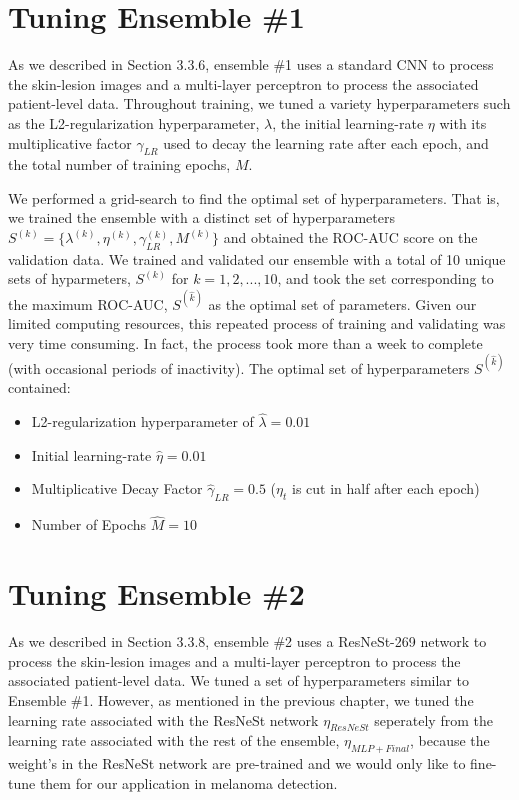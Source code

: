 \documentclass [MAS] {uclathes}
\begin{document}
\section{Tuning Ensemble \#1}

As we described in Section 3.3.6, ensemble \#1 uses a standard CNN to process the skin-lesion images and a multi-layer perceptron to process the associated patient-level data. Throughout training, we tuned a variety hyperparameters such as the L2-regularization hyperparameter, $\lambda$, the initial learning-rate $\eta$ with its multiplicative factor $\gamma_{LR}$ used to decay the learning rate after each epoch, and the total number of training epochs, $M$.

We performed a grid-search to find the optimal set of hyperparameters. That is, we trained the ensemble with a distinct set of hyperparameters $S^{(k)} = \{\lambda^{(k)}, \eta^{(k)}, \gamma_{LR}^{(k)}, M^{(k)}\}$ and obtained the ROC-AUC score on the validation data. We trained and validated our ensemble with a total of 10 unique sets of hyparmeters, $S^{(k)}$ for $k=1, 2, ..., 10$, and took the set corresponding to the maximum ROC-AUC, $S^{(\hat k)}$ as the optimal set of parameters. Given our limited computing resources, this repeated process of training and validating was very time consuming. In fact, the process took more than a week to complete (with occasional periods of inactivity). The optimal set of hyperparameters $S^{(\hat k)}$ contained:

\begin{itemize}
    \item L2-regularization hyperparameter of $\hat \lambda = 0.01$
    \item Initial learning-rate $\hat \eta = 0.01$
    \item Multiplicative Decay Factor $\hat \gamma_{LR} = 0.5$ ($\eta_{t}$ is cut in half after each epoch)
    \item Number of Epochs $\hat M=10$
\end{itemize}


\section{Tuning Ensemble \#2}

As we described in Section 3.3.8, ensemble \#2 uses a ResNeSt-269 network to process the skin-lesion images and a multi-layer perceptron to process the associated patient-level data. We tuned a set of hyperparameters similar to Ensemble \#1. However, as mentioned in the previous chapter, we tuned the learning rate associated with the ResNeSt network $\eta_{ResNeSt}$ seperately from the learning rate associated with the rest of the ensemble, $\eta_{MLP + Final}$, because the weight's in the ResNeSt network are pre-trained and we would only like to fine-tune them for our application in melanoma detection.
\end{document}
